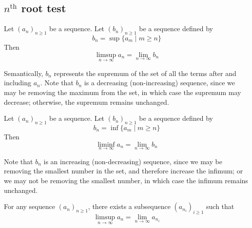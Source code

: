 
\subsection{$n^\text{th}$ root test}
\begin{definition}
  Let $(a_n)_{n \geq 1}$ be a sequence. Let $(b_n)_{n \geq 1}$ be a sequence defined by
  \[
    b_n = \sup \{a_m \;|\; m \geq n \}
  \]
  Then
  \[
    \limsup_{n \to \infty} a_n = \lim_{n \to \infty} b_n
  \]
\end{definition}
Semantically, $b_n$ represents the supremum of the set of all the terms after and including $a_n$. Note that $b_n$ is a decreasing (non-increasing) sequence, since we may be removing the maximum from the set, in which case the supremum may decrease; otherwise, the supremum remains unchanged.
\begin{definition}
  Let $(a_n)_{n \geq 1}$ be a sequence. Let $(b_n)_{n \geq 1}$ be a sequence defined by
  \[
    b_n = \inf \{a_m \;|\; m \geq n \}
  \]
  Then
  \[
    \liminf_{n \to \infty} a_n = \lim_{n \to \infty} b_n
  \]
\end{definition}
Note that $b_n$ is an increasing (non-decreasing) sequence, since we may be removing the smallest number in the set, and therefore increase the infimum; or we may not be removing the smallest number, in which case the infimum remains unchanged.
\begin{lemma}
  For any sequence $(a_n)_{n \geq 1}$, there exists a subsequence $(a_{n_i})_{i \geq 1}$ such that
  \[
    \limsup_{n \to \infty} a_n = \lim_{n \to \infty} a_{n_i}
  \]
\end{lemma}
